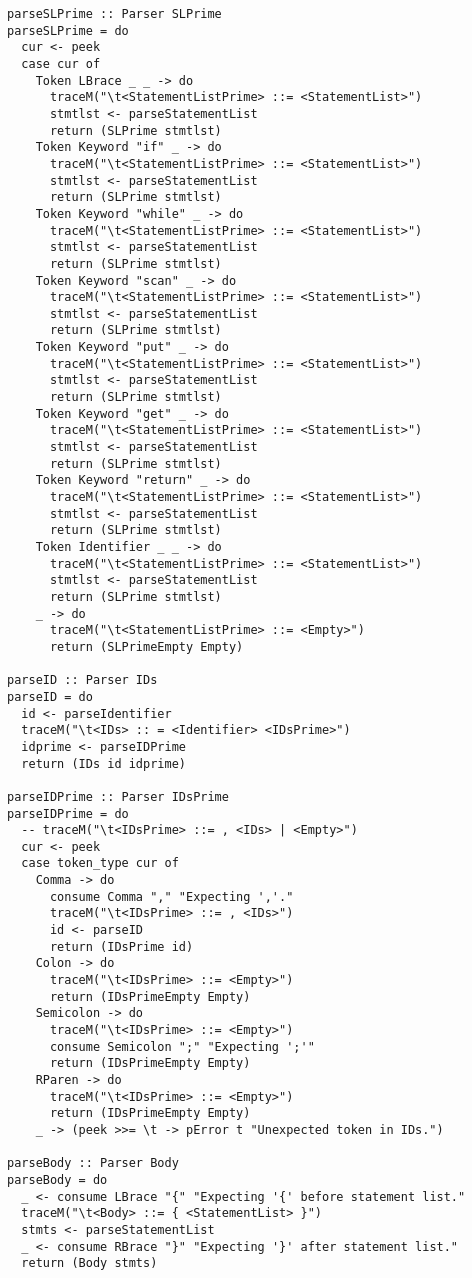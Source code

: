 \documentclass[11pt]{article}
\begin{document}
\begin{verbatim}
parseSLPrime :: Parser SLPrime
parseSLPrime = do
  cur <- peek
  case cur of
    Token LBrace _ _ -> do
      traceM("\t<StatementListPrime> ::= <StatementList>")
      stmtlst <- parseStatementList
      return (SLPrime stmtlst)
    Token Keyword "if" _ -> do
      traceM("\t<StatementListPrime> ::= <StatementList>")
      stmtlst <- parseStatementList
      return (SLPrime stmtlst)
    Token Keyword "while" _ -> do
      traceM("\t<StatementListPrime> ::= <StatementList>")
      stmtlst <- parseStatementList
      return (SLPrime stmtlst)
    Token Keyword "scan" _ -> do
      traceM("\t<StatementListPrime> ::= <StatementList>")
      stmtlst <- parseStatementList
      return (SLPrime stmtlst)
    Token Keyword "put" _ -> do
      traceM("\t<StatementListPrime> ::= <StatementList>")
      stmtlst <- parseStatementList
      return (SLPrime stmtlst)
    Token Keyword "get" _ -> do
      traceM("\t<StatementListPrime> ::= <StatementList>")
      stmtlst <- parseStatementList
      return (SLPrime stmtlst)
    Token Keyword "return" _ -> do
      traceM("\t<StatementListPrime> ::= <StatementList>")
      stmtlst <- parseStatementList
      return (SLPrime stmtlst)
    Token Identifier _ _ -> do
      traceM("\t<StatementListPrime> ::= <StatementList>")
      stmtlst <- parseStatementList
      return (SLPrime stmtlst)
    _ -> do
      traceM("\t<StatementListPrime> ::= <Empty>")
      return (SLPrimeEmpty Empty)

parseID :: Parser IDs
parseID = do
  id <- parseIdentifier
  traceM("\t<IDs> :: = <Identifier> <IDsPrime>")
  idprime <- parseIDPrime
  return (IDs id idprime)

parseIDPrime :: Parser IDsPrime
parseIDPrime = do
  -- traceM("\t<IDsPrime> ::= , <IDs> | <Empty>")
  cur <- peek
  case token_type cur of
    Comma -> do
      consume Comma "," "Expecting ','."
      traceM("\t<IDsPrime> ::= , <IDs>")
      id <- parseID
      return (IDsPrime id)
    Colon -> do
      traceM("\t<IDsPrime> ::= <Empty>")
      return (IDsPrimeEmpty Empty)
    Semicolon -> do
      traceM("\t<IDsPrime> ::= <Empty>")
      consume Semicolon ";" "Expecting ';'"
      return (IDsPrimeEmpty Empty)
    RParen -> do
      traceM("\t<IDsPrime> ::= <Empty>")
      return (IDsPrimeEmpty Empty)
    _ -> (peek >>= \t -> pError t "Unexpected token in IDs.")

parseBody :: Parser Body
parseBody = do
  _ <- consume LBrace "{" "Expecting '{' before statement list."
  traceM("\t<Body> ::= { <StatementList> }")
  stmts <- parseStatementList
  _ <- consume RBrace "}" "Expecting '}' after statement list."
  return (Body stmts)


\end{verbatim}
\end{document}
